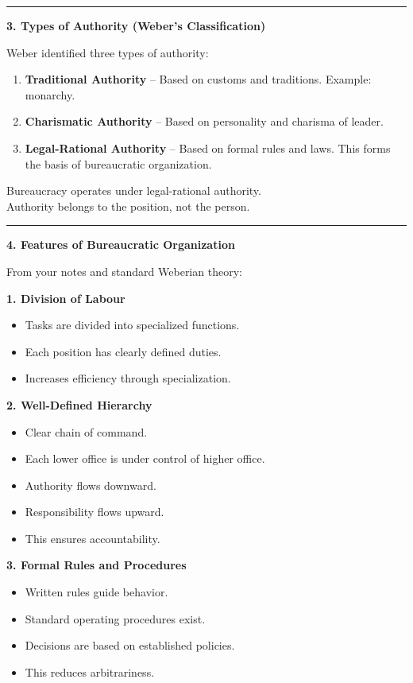\documentclass[10pt,a4paper]{article}
\newcommand{\separator}{\vspace{0.4em}\noindent\rule{\linewidth}{0.6pt}\vspace{0.4em}}
\begin{document}
\separator

\textbf{3. Types of Authority (Weber's Classification)}

Weber identified three types of authority:

\begin{enumerate}
  \item \textbf{Traditional Authority} -- Based on customs and traditions. Example: monarchy.
  \item \textbf{Charismatic Authority} -- Based on personality and charisma of leader.
  \item \textbf{Legal-Rational Authority} -- Based on formal rules and laws. This forms the basis of bureaucratic organization.
\end{enumerate}

Bureaucracy operates under legal-rational authority.\\
Authority belongs to the position, not the person.

\separator

\textbf{4. Features of Bureaucratic Organization}

From your notes and standard Weberian theory:

\textbf{1. Division of Labour}
\begin{itemize}
  \item Tasks are divided into specialized functions.
  \item Each position has clearly defined duties.
  \item Increases efficiency through specialization.
\end{itemize}

\textbf{2. Well-Defined Hierarchy}
\begin{itemize}
  \item Clear chain of command.
  \item Each lower office is under control of higher office.
  \item Authority flows downward.
  \item Responsibility flows upward.
  \item This ensures accountability.
\end{itemize}

\textbf{3. Formal Rules and Procedures}
\begin{itemize}
  \item Written rules guide behavior.
  \item Standard operating procedures exist.
  \item Decisions are based on established policies.
  \item This reduces arbitrariness.
\end{itemize}
\end{document}
